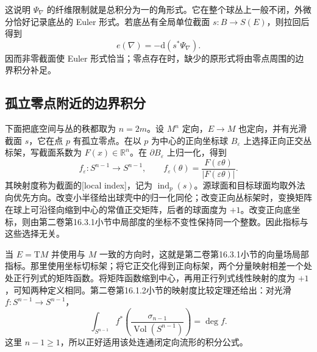 这说明 \(\Psi_\nabla\) 的纤维限制就是总积分为一的角形式。它在整个球丛上一般不闭，外微分恰好记录底丛的 Euler 形式。若底丛有全局单位截面 \(s:B\to S(E)\)，则拉回后得到
\[
	e(\nabla)=-\mathrm d(s^*\Psi_\nabla).
\]
因而非零截面使 Euler 形式恰当；零点存在时，缺少的原形式将由零点周围的边界积分补足。

\subsection{孤立零点附近的边界积分}
\label{g3:subsec:1702:04}
下面把底空间与丛的秩都取为 \(n=2m\)。设 \(M^n\) 定向，\(E\to M\) 也定向，并有光滑截面 \(s\)，它在点 \(p\) 有孤立零点。在以 \(p\) 为中心的正向坐标球 \(B_\varepsilon\) 上选择正向正交丛标架，写截面系数为 \(F(x)\in\mathbb R^n\)。在 \(\partial B_\varepsilon\) 上归一化，得到
\[
	f_\varepsilon:S^{n-1}\longrightarrow S^{n-1},
	\qquad f_\varepsilon(\theta)
	=\frac{F(\varepsilon\theta)}{|F(\varepsilon\theta)|}.
\]
其映射度称为截面的[local index]，记为 \(\operatorname{ind}_p(s)\)。源球面和目标球面均取外法向优先方向。改变小半径给出球壳中的归一化同伦；改变正向丛标架时，变换矩阵在球上可沿径向缩到中心的常值正交矩阵，后者的球面度为 \(+1\)。改变正向底坐标，则由第二卷第16.3.1小节中局部度的坐标不变性保持同一个整数。因此指标与这些选择无关。

\ProseParagraphBreak

当 \(E=\mathrm TM\) 并使用与 \(M\) 一致的方向时，这就是第二卷第16.3.1小节的向量场局部指标。那里使用坐标切标架；将它正交化得到正向标架，两个分量映射相差一个处处正行列式的矩阵函数。将矩阵函数缩到中心，再用正行列式线性映射的度为 \(+1\)，可知两种定义相同。第二卷第16.1.2小节的映射度比较定理还给出：对光滑 \(f:S^{n-1}\to S^{n-1}\)，
\begin{equation}\label{g3:eq:angular-degree-integral}
	\int_{S^{n-1}}f^*\left(\frac{\sigma_{n-1}}{\operatorname{Vol}(S^{n-1})}\right)
	=\deg f.
\end{equation}
这里 \(n-1\ge1\)，所以正好适用该处连通闭定向流形的积分公式。

